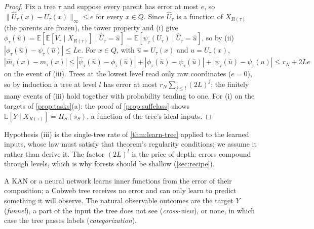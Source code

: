 \documentclass[11pt]{article}
\theoremstyle{definition}
\theoremstyle{remark}
\newcommand{\E}{\mathbb{E}}
\begin{document}
\begin{proof}
Fix a tree $\tau$ and suppose every parent has error at most $e$, so $\|\hat U_\tau(x)-
U_\tau(x)\|_\infty\le e$ for every $x\in Q$.  Since $\hat U_\tau$ is a function of $X_{R(\tau)}$
(the parents are frozen), the tower property and (i) give
$\phi_\tau(\hat u)=\E[\E[V_\tau\mid X_{R(\tau)}]\mid\hat U_\tau=\hat u]=\E[\psi_\tau(U_\tau)\mid\hat
U_\tau=\hat u]$, so by (ii) $|\phi_\tau(\hat u)-\psi_\tau(\hat u)|\le Le$.  For $x\in Q$, with
$\hat u=\hat U_\tau(x)$ and $u=U_\tau(x)$,
\[
  |\hat m_\tau(x)-m_\tau(x)|\le|\hat\psi_\tau(\hat u)-\phi_\tau(\hat u)|
  +|\phi_\tau(\hat u)-\psi_\tau(\hat u)|+|\psi_\tau(\hat u)-\psi_\tau(u)|\le r_N+2Le
\]
on the event of (iii).  Trees at the lowest level read only raw coordinates ($e=0$), so by
induction a tree at level $l$ has error at most $r_N\sum_{j\le l}(2L)^j$; the finitely many
events of (iii) hold together with probability tending to one.  For (i) on the targets of
\cref{prop:tasks}(a): the proof of \cref{prop:suffclass} shows
$\E[Y\mid X_{R(\tau)}]=H_S(s_S)$, a function of the tree's ideal inputs.
\end{proof}

Hypothesis (iii) is the single-tree rate of \cref{thm:learn-tree} applied to the learned
inputs, whose law must satisfy that theorem's regularity conditions; we assume it rather than
derive it.  The factor $(2L)^l$ is the price of depth: errors compound through levels, which
is why forests should be shallow (\cref{sec:recipe}).

A KAN or a neural network learns inner functions from the error of their composition; a
Cobweb tree receives no error and can only learn to predict something it will observe.  The
natural observable outcomes are the target $Y$ (\emph{funnel}), a part of the input the tree
does not see (\emph{cross-view}), or none, in which case the tree passes labels
(\emph{categorization}).
\end{document}
